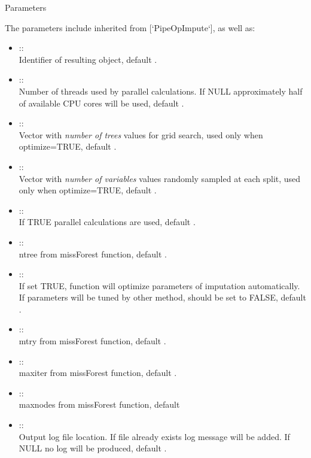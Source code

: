 \documentclass[letterpaper]{book}
\begin{document}
\begin{Section}{Parameters}

The parameters include inherited from [`PipeOpImpute`], as well as: \\{}
\begin{itemize}

\item{}  :: \\{}
Identifier of resulting object, default .
\item{}  :: \\{}
Number of threads used by parallel calculations. If NULL approximately half of available CPU cores will be used, default .
\item{}  :: \\{}
Vector with \emph{number of trees} values for grid search, used only when optimize=TRUE, default .
\item{}  :: \\{}
Vector with \emph{number of variables} values randomly sampled at each split, used only when optimize=TRUE, default .
\item{}  :: \\{}
If TRUE parallel calculations are used, default .
\item{}  :: \\{}
ntree from missForest function, default .
\item{}  :: \\{}
If set TRUE, function will optimize parameters of imputation automatically. If parameters will be tuned by other method, should be set to FALSE, default .
\item{}  :: \\{}
mtry from missForest function, default .
\item{}  :: \\{}
maxiter from missForest function, default .
\item{}  :: \\{}
maxnodes from missForest function, default 
\item{}  :: \\{}
Output log file location. If file already exists log message will be added. If NULL no log will be produced, default .

\end{itemize}

\end{Section}
\end{document}
